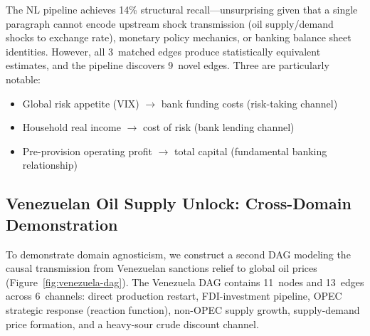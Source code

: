 \documentclass{article}
\begin{document}
The NL pipeline achieves 14\% structural recall---unsurprising given that a single paragraph cannot encode upstream shock transmission (oil supply/demand shocks to exchange rate), monetary policy mechanics, or banking balance sheet identities. However, all 3~matched edges produce statistically equivalent estimates, and the pipeline discovers 9~novel edges. Three are particularly notable:

\begin{itemize}[leftmargin=*, itemsep=1pt]
    \item Global risk appetite (VIX) $\to$ bank funding costs (risk-taking channel)
    \item Household real income $\to$ cost of risk (bank lending channel)
    \item Pre-provision operating profit $\to$ total capital (fundamental banking relationship)
\end{itemize}

\subsection{Venezuelan Oil Supply Unlock: Cross-Domain Demonstration}
\label{sec:venezuela}

To demonstrate domain agnosticism, we construct a second DAG modeling the causal transmission from Venezuelan sanctions relief to global oil prices (Figure~\ref{fig:venezuela-dag}). The Venezuela DAG contains 11~nodes and 13~edges across 6~channels: direct production restart, FDI-investment pipeline, OPEC strategic response (reaction function), non-OPEC supply growth, supply-demand price formation, and a heavy-sour crude discount channel.
\end{document}
